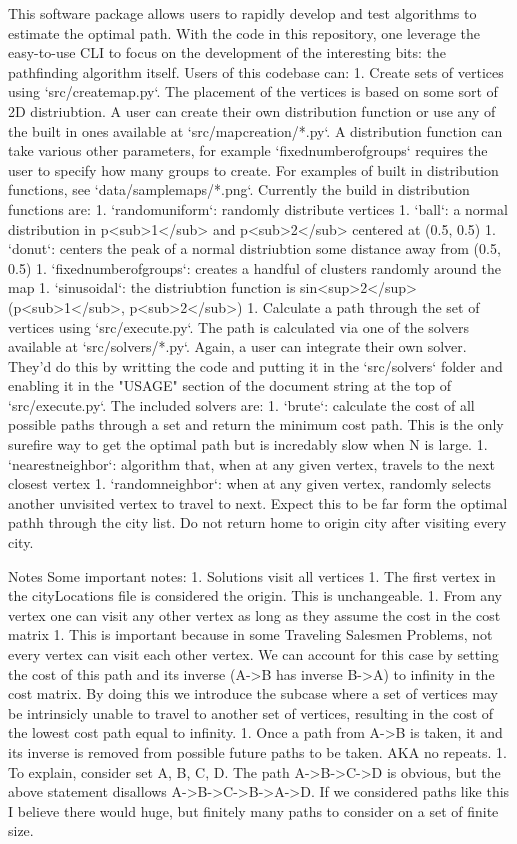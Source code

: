 \documentclass[12pt]{article}
\begin{document}
This software package allows users to rapidly develop and test algorithms to estimate the optimal path.  With the code in this repository, one leverage the easy-to-use CLI to focus on the development of the interesting bits: the pathfinding algorithm itself.  Users of this codebase can:
1.  Create sets of vertices using `src/createmap.py`.  The placement of the vertices is based on some sort of 2D distriubtion.  A user can create their own distribution function or use any of the built in ones available at `src/mapcreation/*.py`.  A distribution function can take various other parameters, for example `fixednumberofgroups` requires the user to specify how many groups to create.  For examples of built in distribution functions, see `data/samplemaps/*.png`.  Currently the build in distribution functions are:
    1.  `randomuniform`: randomly distribute vertices
    1.  `ball`: a normal distribution in p<sub>1</sub> and p<sub>2</sub> centered at (0.5, 0.5)
    1.  `donut`: centers the peak of a normal distriubtion some distance away from (0.5, 0.5)
    1.  `fixednumberofgroups`: creates a handful of clusters randomly around the map
    1.  `sinusoidal`: the distriubtion function is sin<sup>2</sup>(p<sub>1</sub>, p<sub>2</sub>)
1.  Calculate a path through the set of vertices using `src/execute.py`.  The path is calculated via one of the solvers available at `src/solvers/*.py`.  Again, a user can integrate their own solver.  They'd do this by writting the code and putting it in the `src/solvers` folder and enabling it in the "USAGE" section of the document string at the top of `src/execute.py`.  The included solvers are:
    1.  `brute`: calculate the cost of all possible paths through a set and return the minimum cost path.  This is the only surefire way to get the optimal path but is incredably slow when N is large.
    1.  `nearestneighbor`: algorithm that, when at any given vertex, travels to the next closest vertex
    1.  `randomneighbor`: when at any given vertex, randomly selects another unvisited vertex to travel to next.  Expect this to be far form the optimal pathh through the city list. Do not return home to origin city after visiting every city.

Notes
Some important notes:
1.  Solutions visit all vertices
1.  The first vertex in the cityLocations file is considered the origin.  This is unchangeable.
1.  From any vertex one can visit any other vertex as long as they assume the cost in the cost matrix
    1.  This is important because in some Traveling Salesmen Problems, not every vertex can visit each other vertex.  We can account for this case by setting the cost of this path and its inverse (A->B has inverse B->A) to infinity in the cost matrix.  By doing this we introduce the subcase where a set of vertices may be intrinsicly unable to travel to another set of vertices, resulting in the cost of the lowest cost path equal to infinity.
1.  Once a path from A->B is taken, it and its inverse is removed from possible future paths to be taken.  AKA no repeats.
    1.  To explain, consider set {A, B, C, D}.  The path A->B->C->D is obvious, but the above statement disallows A->B->C->B->A->D.  If we considered paths like this I believe there would huge, but finitely many paths to consider on a set of finite size.  
\end{document}
